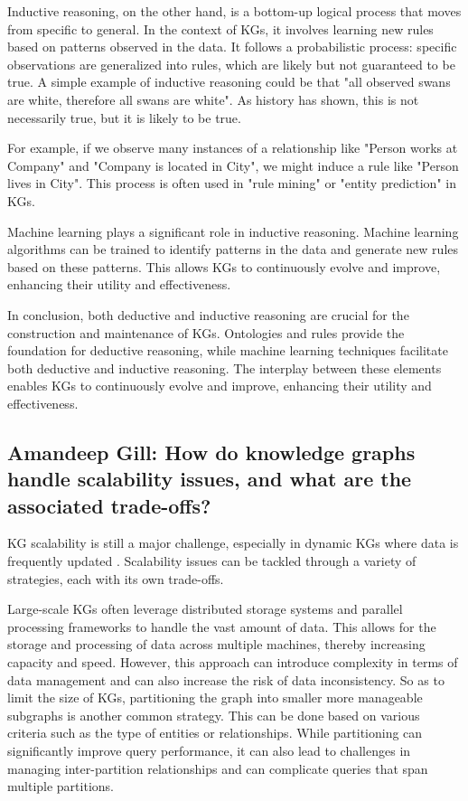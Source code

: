 \documentclass[11pt]{article} %
\begin{document}
Inductive reasoning, on the other hand, is a bottom-up logical process that moves from specific to general. In the context of KGs, it involves learning new rules based on patterns observed in the data. It follows a probabilistic process: specific observations are generalized into rules, which are likely but not guaranteed to be true. A simple example of inductive reasoning could be that "all observed swans are white, therefore all swans are white". As history has shown, this is not necessarily true, but it is likely to be true. 

For example, if we observe many instances of a relationship like "Person works at Company" and "Company is located in City", we might induce a rule like "Person lives in City". This process is often used in "rule mining" or "entity prediction" in KGs.

Machine learning plays a significant role in inductive reasoning. Machine learning algorithms can be trained to identify patterns in the data and generate new rules based on these patterns. This allows KGs to continuously evolve and improve, enhancing their utility and effectiveness.

In conclusion, both deductive and inductive reasoning are crucial for the construction and maintenance of KGs. Ontologies and rules provide the foundation for deductive reasoning, while machine learning techniques facilitate both deductive and inductive reasoning. The interplay between these elements enables KGs to continuously evolve and improve, enhancing their utility and effectiveness.

\subsection{Amandeep Gill:  How do knowledge graphs handle scalability issues, and what are the associated trade-offs?}

KG scalability is still a major challenge, especially in dynamic KGs where data is frequently updated \cite*{CKG23}. Scalability issues can be tackled through a variety of strategies, each with its own trade-offs.

Large-scale KGs often leverage distributed storage systems and parallel processing frameworks to handle the vast amount of data. This allows for the storage and processing of data across multiple machines, thereby increasing capacity and speed. However, this approach can introduce complexity in terms of data management and can also increase the risk of data inconsistency. So as to limit the size of KGs, partitioning the graph into smaller more manageable subgraphs is another common strategy. This can be done based on various criteria such as the type of entities or relationships. While partitioning can significantly improve query performance, it can also lead to challenges in managing inter-partition relationships and can complicate queries that span multiple partitions.
\end{document}
